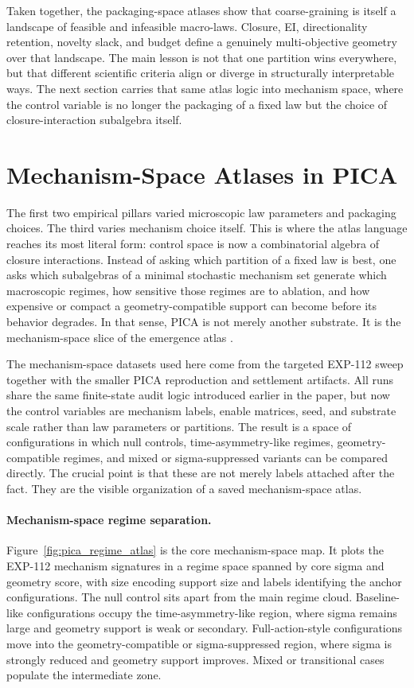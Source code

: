 \documentclass[11pt]{article}
\theoremstyle{definition}
\begin{document}
\FloatBarrier

Taken together, the packaging-space atlases show that coarse-graining is itself a landscape of feasible and infeasible macro-laws. Closure, EI, directionality retention, novelty slack, and budget define a genuinely multi-objective geometry over that landscape. The main lesson is not that one partition wins everywhere, but that different scientific criteria align or diverge in structurally interpretable ways. The next section carries that same atlas logic into mechanism space, where the control variable is no longer the packaging of a fixed law but the choice of closure-interaction subalgebra itself.
 \section{Mechanism-Space Atlases in PICA}\label{sec:pica_space}

The first two empirical pillars varied microscopic law parameters and packaging choices. The third varies mechanism choice itself. This is where the atlas language reaches its most literal form: control space is now a combinatorial algebra of closure interactions. Instead of asking which partition of a fixed law is best, one asks which subalgebras of a minimal stochastic mechanism set generate which macroscopic regimes, how sensitive those regimes are to ablation, and how expensive or compact a geometry-compatible support can become before its behavior degrades. In that sense, PICA is not merely another substrate. It is the mechanism-space slice of the emergence atlas \cite{tsiokos2026_foundations,tsiokos2026_create,tsiokos2026_plot}.

The mechanism-space datasets used here come from the targeted EXP-112 sweep together with the smaller PICA reproduction and settlement artifacts. All runs share the same finite-state audit logic introduced earlier in the paper, but now the control variables are mechanism labels, enable matrices, seed, and substrate scale rather than law parameters or partitions. The result is a space of configurations in which null controls, time-asymmetry-like regimes, geometry-compatible regimes, and mixed or sigma-suppressed variants can be compared directly. The crucial point is that these are not merely labels attached after the fact. They are the visible organization of a saved mechanism-space atlas.

\paragraph{Mechanism-space regime separation.}
Figure~\ref{fig:pica_regime_atlas} is the core mechanism-space map. It plots the EXP-112 mechanism signatures in a regime space spanned by core sigma and geometry score, with size encoding support size and labels identifying the anchor configurations. The null control sits apart from the main regime cloud. Baseline-like configurations occupy the time-asymmetry-like region, where sigma remains large and geometry support is weak or secondary. Full-action-style configurations move into the geometry-compatible or sigma-suppressed region, where sigma is strongly reduced and geometry support improves. Mixed or transitional cases populate the intermediate zone.
\end{document}
